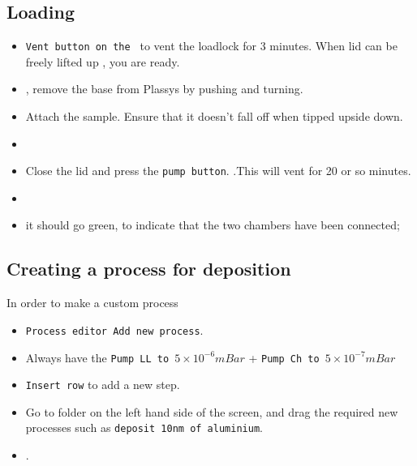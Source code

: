 \subsection{Loading}
\begin{itemize}
\item  \texttt{Vent button  on the  } to
  vent the loadlock for 3 minutes.   When lid can be freely lifted up
  , you are ready.
\item {},  remove the base from  Plassys by pushing
  and turning.
\item Attach the sample. Ensure that  it doesn't fall off when tipped
  upside down.
\item {}
\item Close  the lid and  press the \texttt{pump  button}. .This will vent for 20
  or so minutes.  
\item   {}
\item  {}  \ira it should go green, to
  indicate that the two chambers have been connected;
\end{itemize}

  \subsection{Creating a process for deposition}
  In order to make a custom process

  \begin{itemize}
  \item \texttt{Process editor \ira Add new process}.
  \item Always  have the  \texttt{Pump LL to  $5\times10^{-6}mBar$} +
    \texttt{Pump Ch to $5\times10^{-7}mBar$}
  \item \texttt{Insert row} to add a new step.
  \item Go to  folder on the left  hand side of the  screen, and drag
    the  required  new  processes  such as  \texttt{deposit  10nm  of
      aluminium}.
  \item {}.
  \end{itemize}

